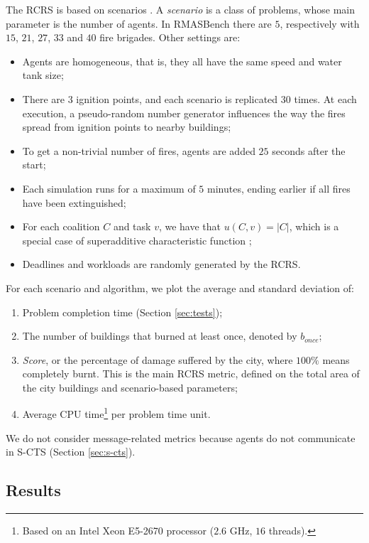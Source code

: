 The RCRS is based on scenarios \cite{rcrsmanual}. A \emph{scenario} is a class of
problems, whose main parameter is the number of agents. In RMASBench there are $5$,
respectively with $15$, $21$, $27$, $33$ and $40$ fire brigades. Other settings are:
\begin{itemize}
    \item Agents are homogeneous, that is, they all have the same speed and water tank
        size;
    \item There are $3$ ignition points, and each scenario is replicated $30$ times. At
        each execution, a pseudo-random number generator influences the way the fires
        spread from ignition points to nearby buildings;
    \item To get a non-trivial number of fires, agents are added $25$ seconds after
        the start;
    \item Each simulation runs for a maximum of $5$ minutes, ending earlier if all fires
        have been extinguished;
    \item For each coalition $C$ and task $v$, we have that $u(C, v) = |C|$, which is a
        special case of superadditive characteristic function \cite[Section
        $2.1.2.2$]{chalkiadakis2011};
    \item Deadlines and workloads are randomly generated by the RCRS.
\end{itemize}
For each scenario and algorithm, we plot the average and standard deviation of:
\begin{enumerate}
    \item Problem completion time (Section \ref{sec:tests});
    \item The number of buildings that burned at least once, denoted by $b_{once}$;
    \item \emph{Score}, or the percentage of damage suffered by the city, where $100\%$
        means completely burnt. This is the main RCRS metric, defined on the total area of
        the city buildings and scenario-based parameters;
    \item Average CPU time\footnote{Based on an Intel Xeon E5-2670 processor ($2.6$ GHz,
        $16$ threads).} per problem time unit.
\end{enumerate}
We do not consider message-related metrics because agents do not communicate in S-CTS
(Section \ref{sec:s-cts}).

\subsection{Results}\label{sec:roboresults}

